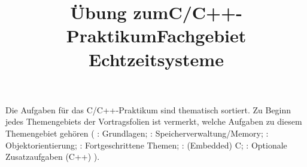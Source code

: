 

\title{Übung zum\linebreak[1]C/C++-Praktikum\linebreak[1] Fachgebiet Echtzeitsysteme}

\setcounter{section}{0}



\maketitle

\noindent Die Aufgaben für das C/C++-Praktikum sind thematisch sortiert.
Zu Beginn jedes Themengebiets der Vortragsfolien ist vermerkt, welche Aufgaben zu diesem Themengebiet gehören (%
\ExercisePrefixBasics{}: Grundlagen; 
\ExercisePrefixMemory{}: Speicherverwaltung/Memory;
\ExercisePrefixObjectOrientation{}: Objektorientierung;
\ExercisePrefixAdvanced{}: Fortgeschrittene Themen;
\ExercisePrefixEmbeddedC{}: (Embedded) C;
\ExercisePrefixElevator{}: Optionale Zusatzaufgaben (C++)
).
%
\setcounter{tocdepth}{1}
\setlength\cftsecnumwidth{10em}
\setlength\cftbeforesecskip{.1em} %
\tableofcontents

\vspace*{\fill}
\cclicense

\newpage






\newpage

\newpage

\newpage


\newpage
{}

\newpage

\newpage

\newpage

\newpage


\newpage
{}

\newpage

\newpage



